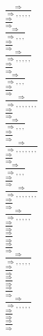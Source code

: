 \documentclass[11pt]{article}
\begin{document}
\begin{center}
\bigskip
\\$\frac{\Rightarrow }{\Rightarrow , , , , , }$
\bigskip
\\$\frac{\Rightarrow }{\Rightarrow }$
\bigskip
\\$\frac{\Rightarrow }{\Rightarrow , , , }$
\bigskip
\\$\frac{\Rightarrow }{\Rightarrow }$
\bigskip
\\$\frac{\Rightarrow }{\Rightarrow , , , , , }$
\bigskip
\\$\frac{\Rightarrow }{\Rightarrow }$
\bigskip
\\$\frac{\Rightarrow }{\Rightarrow , , , }$
\bigskip
\\$\frac{\Rightarrow }{\Rightarrow }$
\bigskip
\\$\frac{\Rightarrow }{\Rightarrow , , , , , , , }$
\bigskip
\\$\frac{\Rightarrow }{\Rightarrow }$
\bigskip
\\$\frac{\Rightarrow }{\Rightarrow , , , }$
\bigskip
\\$\frac{\Rightarrow }{\Rightarrow }$
\bigskip
\\$\frac{\Rightarrow }{\Rightarrow , , , , , , , }$
\bigskip
\\$\frac{\Rightarrow }{\Rightarrow }$
\bigskip
\\$\frac{\Rightarrow }{\Rightarrow , , , }$
\bigskip
\\$\frac{\Rightarrow }{\Rightarrow }$
\bigskip
\\$\frac{\Rightarrow }{\Rightarrow , , , , , , , }$
\bigskip
\\$\frac{\Rightarrow }{\Rightarrow }$
\bigskip
\\$\frac{\Rightarrow }{\Rightarrow , , , , , }$
\bigskip
\\$\frac{\Rightarrow }{\Rightarrow }$
\bigskip
\\$\frac{\Rightarrow }{\Rightarrow }$
\bigskip
\\$\frac{\Rightarrow }{\Rightarrow }$
\bigskip
\\$\frac{\Rightarrow }{\Rightarrow , , , , , }$
\bigskip
\\$\frac{\Rightarrow }{\Rightarrow }$
\bigskip
\\$\frac{\Rightarrow }{\Rightarrow }$
\bigskip
\\$\frac{\Rightarrow }{\Rightarrow }$
\bigskip
\\$\frac{\Rightarrow }{\Rightarrow , , , , , }$
\bigskip
\\$\frac{\Rightarrow }{\Rightarrow }$
\bigskip
\\$\frac{\Rightarrow }{\Rightarrow }$

\end{center}
\end{document}
